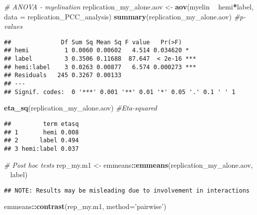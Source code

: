\documentclass[
]{article}
\newenvironment{Shaded}{\begin{snugshade}}{\end{snugshade}}
\newcommand{\CommentTok}[1]{\textcolor[rgb]{0.56,0.35,0.01}{\textit{#1}}}
\newcommand{\DataTypeTok}[1]{\textcolor[rgb]{0.13,0.29,0.53}{#1}}
\newcommand{\KeywordTok}[1]{\textcolor[rgb]{0.13,0.29,0.53}{\textbf{#1}}}
\newcommand{\NormalTok}[1]{#1}
\newcommand{\OperatorTok}[1]{\textcolor[rgb]{0.81,0.36,0.00}{\textbf{#1}}}
\newcommand{\StringTok}[1]{\textcolor[rgb]{0.31,0.60,0.02}{#1}}
\begin{document}
\begin{Shaded}
\begin{Highlighting}[]
\CommentTok{# ANOVA - myelination}
\NormalTok{replication_my_alone.aov <-}\StringTok{ }\KeywordTok{aov}\NormalTok{(myelin }\OperatorTok{~}\StringTok{ }\NormalTok{hemi}\OperatorTok{*}\NormalTok{label, }\DataTypeTok{data =}\NormalTok{ replication_PCC_analysis)}
\KeywordTok{summary}\NormalTok{(replication_my_alone.aov) }\CommentTok{#p-values}
\end{Highlighting}
\end{Shaded}

\begin{verbatim}
##              Df Sum Sq Mean Sq F value   Pr(>F)    
## hemi          1 0.0060 0.00602   4.514 0.034620 *  
## label         3 0.3506 0.11688  87.647  < 2e-16 ***
## hemi:label    3 0.0263 0.00877   6.574 0.000273 ***
## Residuals   245 0.3267 0.00133                     
## ---
## Signif. codes:  0 '***' 0.001 '**' 0.01 '*' 0.05 '.' 0.1 ' ' 1
\end{verbatim}

\begin{Shaded}
\begin{Highlighting}[]
\KeywordTok{eta_sq}\NormalTok{(replication_my_alone.aov) }\CommentTok{#Eta-squared}
\end{Highlighting}
\end{Shaded}

\begin{verbatim}
##         term etasq
## 1       hemi 0.008
## 2      label 0.494
## 3 hemi:label 0.037
\end{verbatim}

\begin{Shaded}
\begin{Highlighting}[]
\CommentTok{# Post hoc tests}
\NormalTok{rep_my.m1 <-}\StringTok{ }\NormalTok{emmeans}\OperatorTok{::}\KeywordTok{emmeans}\NormalTok{(replication_my_alone.aov, }\OperatorTok{~}\StringTok{ }\NormalTok{label)}
\end{Highlighting}
\end{Shaded}

\begin{verbatim}
## NOTE: Results may be misleading due to involvement in interactions
\end{verbatim}

\begin{Shaded}
\begin{Highlighting}[]
\NormalTok{emmeans}\OperatorTok{::}\KeywordTok{contrast}\NormalTok{(rep_my.m1, }\DataTypeTok{method=}\StringTok{'pairwise'}\NormalTok{)}
\end{Highlighting}
\end{Shaded}
\end{document}
